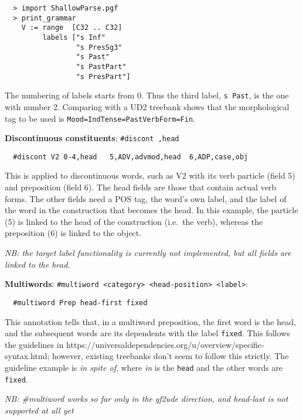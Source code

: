 \begin{verbatim}
  > import ShallowParse.pgf
  > print_grammar
    V := range  [C32 .. C32]
         labels ["s Inf"
                 "s PresSg3"
                 "s Past"
                 "s PastPart"
                 "s PresPart"]
\end{verbatim}

The numbering of labels starts from 0. Thus the third label,
\texttt{s\ Past}, is the one with number 2. Comparing with a UD2
treebank shows that the morphological tag to be used is
\texttt{Mood=Ind\textbar{}Tense=Past\textbar{}VerbForm=Fin}.

\textbf{Discontinuous constituents}: \texttt{\#discont ,head}

\begin{verbatim}
  #discont V2 0-4,head   5,ADV,advmod,head  6,ADP,case,obj
\end{verbatim}

This is applied to discontinuous words, such as V2 with its verb
particle (field 5) and preposition (field 6). The head fields are those
that contain actual verb forms. The other fields need a POS tag, the
word's own label, and the label of the word in the construction that
becomes the head. In this example, the particle (5) is linked to the
head of the construction (i.e.~the verb), whereas the preposition (6) is
linked to the object.

\emph{NB: the target label functionality is currently not implemented, but
all fields are linked to the head.}

\textbf{Multiwords}:
\texttt{\#multiword\ \textless{}category\textgreater{}\ \textless{}head-position\textgreater{}\ \textless{}label\textgreater{}}:

\begin{verbatim}
  #multiword Prep head-first fixed
\end{verbatim}

This annotation tells that, in a multiword preposition, the first word
is the head, and the subsequent words are its dependents with the label
\texttt{fixed}. This follows the guidelines in
https://universaldependencies.org/u/overview/specific-syntax.html;
however, existing treebanks don't seem to follow this strictly. The
guideline example is \emph{in spite of}, where \emph{in} is the \texttt{head}
and the other words are \texttt{fixed}.

\emph{NB: \#multiword works so far only in the gf2ude direction, and
head-last is not supported at all yet}

